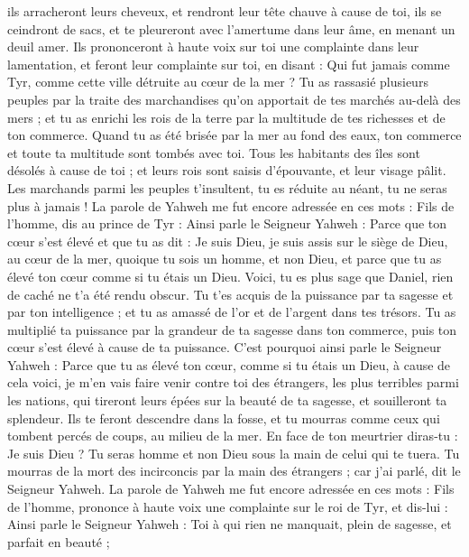 \begin{multicols}{2}
ils arracheront leurs cheveux, et rendront leur tête chauve à cause de toi, ils se ceindront de sacs, et te pleureront avec l'amertume dans leur âme, en menant un deuil amer.
Ils prononceront à haute voix sur toi une complainte dans leur lamentation, et feront leur complainte sur toi, en disant : Qui fut jamais comme Tyr, comme cette ville détruite au cœur de la mer ?
Tu as rassasié plusieurs peuples par la traite des marchandises qu'on apportait de tes marchés au-delà des mers ; et tu as enrichi les rois de la terre par la multitude de tes richesses et de ton commerce.
Quand tu as été brisée par la mer au fond des eaux, ton commerce et toute ta multitude sont tombés avec toi.
Tous les habitants des îles sont désolés à cause de toi ; et leurs rois sont saisis d'épouvante, et leur visage pâlit.
Les marchands parmi les peuples t'insultent, tu es réduite au néant, tu ne seras plus à jamais !
\VerseOne{}La parole de Yahweh me fut encore adressée en ces mots :
Fils de l'homme, dis au prince de Tyr : Ainsi parle le Seigneur Yahweh : Parce que ton cœur s'est élevé et que tu as dit : Je suis Dieu, je suis assis sur le siège de Dieu, au cœur de la mer, quoique tu sois un homme, et non Dieu, et parce que tu as élevé ton cœur comme si tu étais un Dieu.
Voici, tu es plus sage que Daniel, rien de caché ne t'a été rendu obscur.
Tu t'es acquis de la puissance par ta sagesse et par ton intelligence ; et tu as amassé de l'or et de l'argent dans tes trésors.
Tu as multiplié ta puissance par la grandeur de ta sagesse dans ton commerce, puis ton cœur s'est élevé à cause de ta puissance.
C'est pourquoi ainsi parle le Seigneur Yahweh : Parce que tu as élevé ton cœur, comme si tu étais un Dieu,
à cause de cela voici, je m'en vais faire venir contre toi des étrangers, les plus terribles parmi les nations, qui tireront leurs épées sur la beauté de ta sagesse, et souilleront ta splendeur.
Ils te feront descendre dans la fosse, et tu mourras comme ceux qui tombent percés de coups, au milieu de la mer.
En face de ton meurtrier diras-tu : Je suis Dieu ? Tu seras homme et non Dieu sous la main de celui qui te tuera.
Tu mourras de la mort des incirconcis par la main des étrangers ; car j'ai parlé, dit le Seigneur Yahweh.
La parole de Yahweh me fut encore adressée en ces mots :
Fils de l'homme, prononce à haute voix une complainte sur le roi de Tyr, et dis-lui : Ainsi parle le Seigneur Yahweh : Toi à qui rien ne manquait, plein de sagesse, et parfait en beauté ;

\end{multicols}

